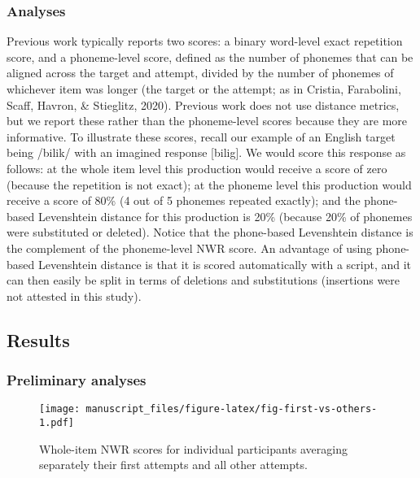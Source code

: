 \documentclass[
  english,
  ,man,floatsintext]{apa6}
\begin{document}
\hypertarget{analyses}{%
\subsubsection{Analyses}\label{analyses}}

Previous work typically reports two scores: a binary word-level exact repetition score, and a phoneme-level score, defined as the number of phonemes that can be aligned across the target and attempt, divided by the number of phonemes of whichever item was longer (the target or the attempt; as in Cristia, Farabolini, Scaff, Havron, \& Stieglitz, 2020). Previous work does not use distance metrics, but we report these rather than the phoneme-level scores because they are more informative. To illustrate these scores, recall our example of an English target being /bilik/ with an imagined response {[}bilig{]}. We would score this response as follows: at the whole item level this production would receive a score of zero (because the repetition is not exact); at the phoneme level this production would receive a score of 80\% (4 out of 5 phonemes repeated exactly); and the phone-based Levenshtein distance for this production is 20\% (because 20\% of phonemes were substituted or deleted). Notice that the phone-based Levenshtein distance is the complement of the phoneme-level NWR score. An advantage of using phone-based Levenshtein distance is that it is scored automatically with a script, and it can then easily be split in terms of deletions and substitutions (insertions were not attested in this study).

\hypertarget{results}{%
\subsection{Results}\label{results}}

\hypertarget{preliminary-analyses}{%
\subsubsection{Preliminary analyses}\label{preliminary-analyses}}

\begin{figure}
\centering
\texttt{[image: manuscript\_files/figure-latex/fig-first-vs-others-1.pdf]}
\caption{\label{fig:fig-first-vs-others}Whole-item NWR scores for individual participants averaging separately their first attempts and all other attempts.}
\end{figure}
\end{document}
